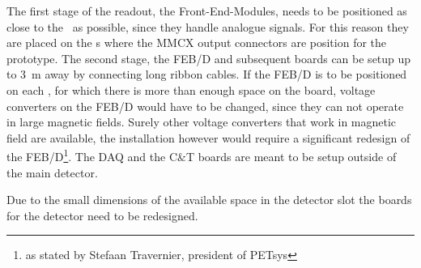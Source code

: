 \documentclass[../BTOF_summary.tex]{subfiles}
\begin{document}
The first stage of the readout, the Front-End-Modules, needs to be positioned as close to the \sipms\ as possible, since they handle analogue signals.
For this reason they are placed on the \railboard s where the MMCX output connectors are position for the prototype.
The second stage, the FEB/D and subsequent boards can be setup up to \SI{3}{m} away by connecting long ribbon cables.
If the FEB/D is to be positioned on each \sm , for which there is more than enough space on the board, voltage converters on the FEB/D would have to be changed, since they can not operate in large magnetic fields.
Surely other voltage converters that work in magnetic field are available, the installation however would require a significant redesign of the FEB/D\footnote{as stated by Stefaan Travernier, president of PETsys}.
The DAQ and the C\&T boards are meant to be setup outside of the main detector.

Due to the small dimensions of the available space in the detector slot the boards for the detector need to be redesigned.
\end{document}
